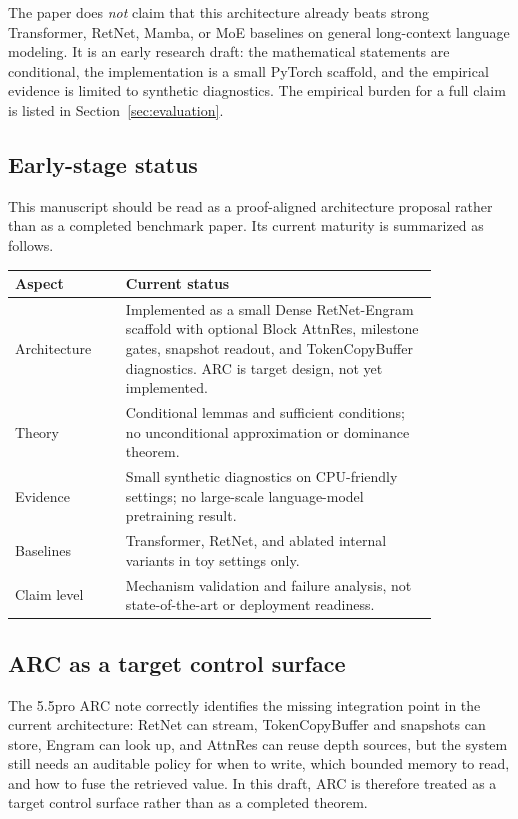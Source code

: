 \documentclass[11pt]{article}
\begin{document}
The paper does \emph{not} claim that this architecture already beats strong Transformer, RetNet, Mamba, or MoE baselines on general long-context language modeling. It is an early research draft: the mathematical statements are conditional, the implementation is a small PyTorch scaffold, and the empirical evidence is limited to synthetic diagnostics. The empirical burden for a full claim is listed in Section~\ref{sec:evaluation}.

\subsection{Early-stage status}

This manuscript should be read as a proof-aligned architecture proposal rather than as a completed benchmark paper. Its current maturity is summarized as follows.
\begin{center}
\begin{tabular}{p{0.22\linewidth}p{0.62\linewidth}}
\toprule
Aspect & Current status \\
\midrule
Architecture & Implemented as a small Dense RetNet-Engram scaffold with optional Block AttnRes, milestone gates, snapshot readout, and TokenCopyBuffer diagnostics. ARC is target design, not yet implemented. \\
Theory & Conditional lemmas and sufficient conditions; no unconditional approximation or dominance theorem. \\
Evidence & Small synthetic diagnostics on CPU-friendly settings; no large-scale language-model pretraining result. \\
Baselines & Transformer, RetNet, and ablated internal variants in toy settings only. \\
Claim level & Mechanism validation and failure analysis, not state-of-the-art or deployment readiness. \\
\bottomrule
\end{tabular}
\end{center}

\subsection{ARC as a target control surface}

The 5.5pro ARC note correctly identifies the missing integration point in the
current architecture: RetNet can stream, TokenCopyBuffer and snapshots can store,
Engram can look up, and AttnRes can reuse depth sources, but the system still
needs an auditable policy for when to write, which bounded memory to read, and
how to fuse the retrieved value. In this draft, ARC is therefore treated as a
target control surface rather than as a completed theorem.
\end{document}
